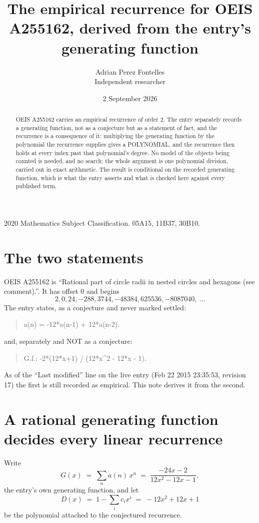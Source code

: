 \documentclass[11pt,a4paper]{article}
\title{The empirical recurrence for OEIS A255162, derived from the entry's generating function}
\author{Adrian Perez Fontelles\\ \small Independent researcher}
\date{2 September 2026}
\theoremstyle{plain}
\theoremstyle{definition}
\begin{document}
\maketitle

\begin{abstract}
OEIS A255162 carries an empirical recurrence of order $2$. The entry separately records a
generating function, not as a conjecture but as a statement of fact, and the recurrence is a
consequence of it: multiplying the generating function by the polynomial the recurrence
supplies gives a POLYNOMIAL, and the recurrence then holds at every index past that
polynomial's degree. No model of the objects being counted is needed, and no search: the
whole argument is one polynomial division, carried out in exact arithmetic. The result is
conditional on the recorded generating function, which is what the entry asserts and what is
checked here against every published term.
\end{abstract}

\noindent\small 2020 Mathematics Subject Classification. 05A15, 11B37, 30B10.\normalsize

\section{The two statements}

OEIS A255162 is ``Rational part of circle radii in nested circles and hexagons (see comment).''. It has offset $0$ and begins
\[
2, 0, 24, -288, 3744, -48384, 625536, -8087040,\ \dots
\]
The entry states, as a conjecture and never marked settled:
\begin{quote}
a(n) = -12*a(n-1) + 12*a(n-2).
\end{quote}
and, separately and NOT as a conjecture:
\begin{quote}
G.f.: -2*(12*x+1) / (12*x\^{}2 - 12*x - 1).
\end{quote}
As of the ``Last modified'' line on the live entry (Feb 22 2015 23:35:53, revision 17) the first is still
recorded as empirical. This note derives it from the second.

\section{A rational generating function decides every linear recurrence}

Write
\[
G(x)\;=\;\sum_{n}a(n)\,x^{n}\;=\;\frac{- 24 x - 2}{12 x^{2} - 12 x - 1},
\]
the entry's own generating function, and let
\[
D(x)\;=\;1-\sum_i c_i x^{i}\;=\;- 12 x^{2} + 12 x + 1
\]
be the polynomial attached to the conjectured recurrence.
\end{document}

